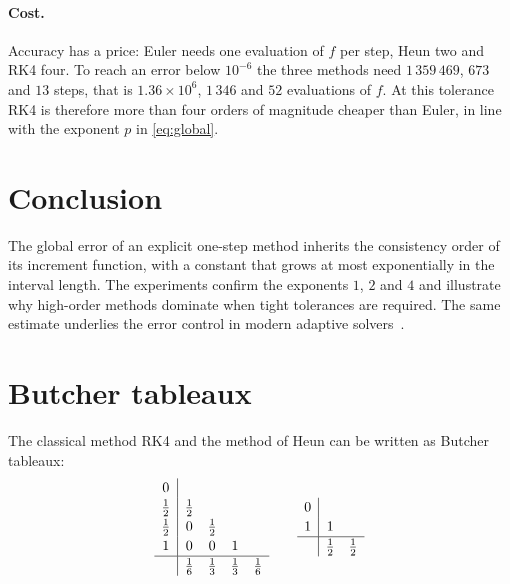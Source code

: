 \documentclass[a4paper,10pt,twocolumn]{article}
\theoremstyle{plain}
\theoremstyle{definition}
\theoremstyle{remark}
\begin{document}
\paragraph{Cost.}
Accuracy has a price: Euler needs one evaluation of $f$ per step, Heun two and RK4 four. To reach an error below $10^{-6}$ the three methods need $1\,359\,469$, $673$ and $13$ steps, that is $1.36\times10^{6}$, $1\,346$ and $52$ evaluations of $f$. At this tolerance RK4 is therefore more than four orders of magnitude cheaper than Euler, in line with the exponent $p$ in \eqref{eq:global}.

\section{Conclusion}
The global error of an explicit one-step method inherits the consistency order of its increment function, with a constant that grows at most exponentially in the interval length. The experiments confirm the exponents $1$, $2$ and $4$ and illustrate why high-order methods dominate when tight tolerances are required. The same estimate underlies the error control in modern adaptive solvers~\cite{hairer1993}.

\appendix
\section{Butcher tableaux}\label{app:tableau}
The classical method RK4 and the method of Heun can be written as Butcher tableaux:
\[
\renewcommand{\arraystretch}{1.15}
\begin{array}{c|cccc}
  0   &     &     &     &     \\
  \tfrac12 & \tfrac12 &   &     &     \\
  \tfrac12 & 0   & \tfrac12 &   &     \\
  1   & 0   & 0   & 1   &     \\ \hline
      & \tfrac16 & \tfrac13 & \tfrac13 & \tfrac16
\end{array}
\qquad
\begin{array}{c|cc}
  0 &     &     \\
  1 & 1   &     \\ \hline
    & \tfrac12 & \tfrac12
\end{array}
\]

\printbibliography[title={References}]
\end{document}
